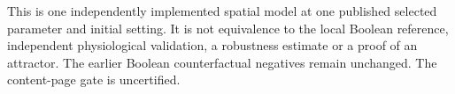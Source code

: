 This is one independently implemented spatial model at one published selected parameter and initial setting. It is not equivalence to the local Boolean reference, independent physiological validation, a robustness estimate or a proof of an attractor. The earlier Boolean counterfactual negatives remain unchanged. The content-page gate is uncertified.
